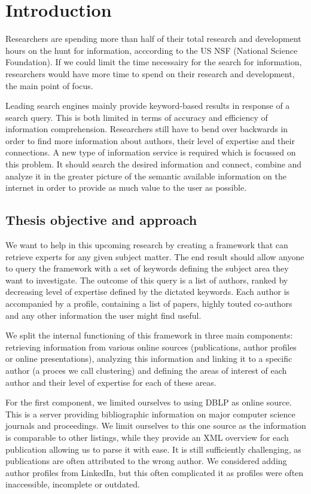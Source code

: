 \chapter{Introduction}

Researchers are spending more than half of their total research and development hours on the hunt for information, acccording to the US NSF (National Science Foundation). If we could limit the time necessairy for the search for information, researchers would have more time to spend on their research and development, the main point of focus.

Leading search engines mainly provide keyword-based results in response of a search query. This is both limited in terms of accuracy and efficiency of information comprehension. Researchers still have to bend over backwards in order to find more information about authors, their level of expertise and their connections. A new type of information service is required which is focussed on this problem. It should search the desired information and connect, combine and analyze it in the greater picture of the semantic available information on the internet in order to provide as much value to the user as possible.


\section{Thesis objective and approach}

We want to help in this upcoming research by creating a framework that can retrieve experts for any given subject matter. The end result should allow anyone to query the framework with a set of keywords defining the subject area they want to investigate. The outcome of this query is a list of authors, ranked by decreasing level of expertise defined by the dictated keywords. Each author is accompanied by a profile, containing a list of papers, highly touted co-authors and any other information the user might find useful.

We split the internal functioning of this framework in three main components: retrieving information from various online sources (publications, author profiles or online presentations), analyzing this information and linking it to a specific author (a proces we call clustering) and defining the areas of interest of each author and their level of expertise for each of these areas.

For the first component, we limited ourselves to using DBLP \cite{dblp} as online source. This is a server providing bibliographic information on major computer science journals and proceedings. We limit ourselves to this one source as the information is comparable to other listings, while they provide an XML overview for each publication allowing us to parse it with ease. It is still sufficiently challenging, as publications are often attributed to the wrong author. We considered adding author profiles from LinkedIn, but this often complicated it as profiles were often inaccessible, incomplete or outdated.

